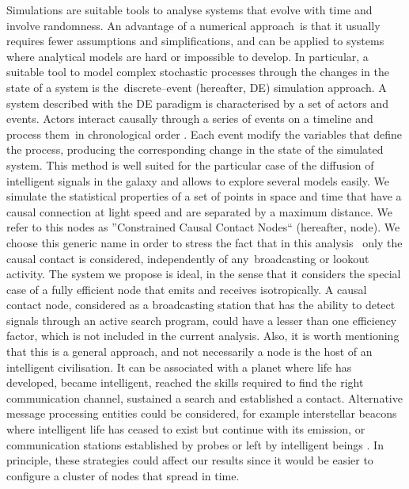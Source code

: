 \documentclass[crop]{CSLB}
\newcommand{\ceti}{node}
\newcommand{\cetis}{nodes}
\begin{document}
Simulations are suitable tools to analyse systems that evolve with
time and involve randomness.
%
An advantage of a numerical approach is that it usually requires fewer
assumptions and simplifications, and can be applied to systems where
analytical models are hard or impossible to develop.
%
In particular, a suitable tool to model complex stochastic processes
through the changes in the state of a system is the discrete--event
(hereafter, DE) simulation approach.
%
A system described with the DE paradigm is characterised by a set of
actors and events.
%
Actors interact causally through a series of events on a timeline and
process them in chronological order \citep{ptolemaeus_system_2014,
chung_simulation_2003, ross_simulation_2012}.
%
Each event modify the variables that define the process, producing the
corresponding change in the state of the simulated system.
%
This method is well suited for the particular case of the diffusion of
intelligent signals in the galaxy and allows to explore several models
easily.
%
We simulate the statistical properties of a set of points in space and
time that have a causal connection at light speed and are separated by
a maximum distance.
%
We refer to this nodes as ''Constrained Causal Contact Nodes``
(hereafter, \ceti{}).
%
We choose this generic name in order to stress the fact that in this
analysis  only the causal contact is considered, independently of
any broadcasting or lookout activity.
%
The system we propose is ideal, in the sense that it considers the
special case of a fully efficient node that emits and receives
isotropically.
%
A causal contact node, considered as a broadcasting station that has
the ability to detect signals through an active search program, could
have a lesser than one efficiency factor, which is not included in the
current analysis.
%
Also, it is worth mentioning that this is a general approach, and not
necessarily a \ceti{} is the host of an intelligent civilisation.
%
It can be associated with a planet where life has developed, became
intelligent, reached the skills required to find the right
communication channel, sustained a search and established a contact.
%
Alternative message processing entities could be considered, for
example interstellar beacons where intelligent life has ceased to
exist but continue with its emission, or communication stations
established by probes or left by intelligent beings \citep[see, e.g.,
][]{peters_outer_2018, barlow_galactic_2013}.
%
In principle, these strategies could affect our results since it would
be easier to configure a cluster of \cetis{} that spread in time.
\end{document}

